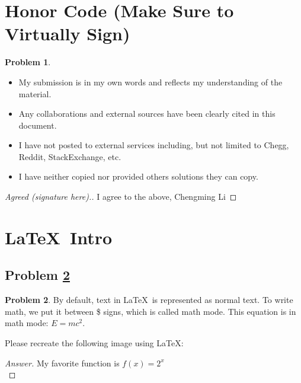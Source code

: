 \documentclass[11pt]{article}
\theoremstyle{definition}
\theoremstyle{definition}
\newtheorem{required}{Problem}
\theoremstyle{definition}
\begin{document}
\section{Honor Code (Make Sure to Virtually Sign)} \label{HonorCode}

\begin{required}
\begin{itemize}
\item My submission is in my own words and reflects my understanding of the material.
\item Any collaborations and external sources have been clearly cited in this document.
\item I have not posted to external services including, but not limited to Chegg, Reddit, StackExchange, etc.
\item I have neither copied nor provided others solutions they can copy.
\end{itemize}

\end{required}

\begin{proof}[Agreed (signature here).]
I agree to the above, Chengming Li
\end{proof}


\newpage
\section{\LaTeX\ Intro}

\subsection{Problem \ref{Latex1}}
\begin{required} \label{Latex1}
By default, text in \LaTeX\ is represented as normal text. To write math, we put it between \$ signs, which is called math mode.
This equation is in math mode: $E=mc^2$.

Please recreate the following image using \LaTeX:

\end{required}

\begin{proof}[Answer]

My favorite function is $f(x) = 2^x$\\
\end{proof}
\end{document}
